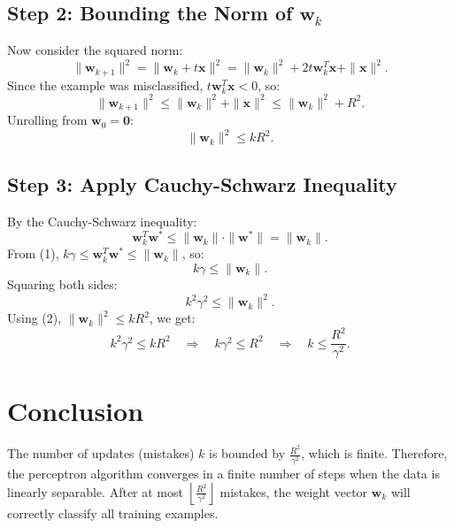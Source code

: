 \documentclass{article}
\begin{document}
\subsection*{Step 2: Bounding the Norm of $\mathbf{w}_k$}

Now consider the squared norm:
\[
\|\mathbf{w}_{k+1}\|^2 = \|\mathbf{w}_k + t \mathbf{x}\|^2 = \|\mathbf{w}_k\|^2 + 2t \mathbf{w}_k^T \mathbf{x} + \|\mathbf{x}\|^2.
\]
Since the example was misclassified, $t \mathbf{w}_k^T \mathbf{x} < 0$, so:
\[
\|\mathbf{w}_{k+1}\|^2 \leq \|\mathbf{w}_k\|^2 + \|\mathbf{x}\|^2 \leq \|\mathbf{w}_k\|^2 + R^2.
\]
Unrolling from $\mathbf{w}_0 = \mathbf{0}$:
\[
\|\mathbf{w}_k\|^2 \leq k R^2.
\tag{2}
\]

\subsection*{Step 3: Apply Cauchy-Schwarz Inequality}

By the Cauchy-Schwarz inequality:
\[
\mathbf{w}_k^T \mathbf{w}^* \leq \|\mathbf{w}_k\| \cdot \|\mathbf{w}^*\| = \|\mathbf{w}_k\|.
\]
From (1), $k \gamma \leq \mathbf{w}_k^T \mathbf{w}^* \leq \|\mathbf{w}_k\|$, so:
\[
k \gamma \leq \|\mathbf{w}_k\|.
\]
Squaring both sides:
\[
k^2 \gamma^2 \leq \|\mathbf{w}_k\|^2.
\]
Using (2), $\|\mathbf{w}_k\|^2 \leq k R^2$, we get:
\[
k^2 \gamma^2 \leq k R^2 \quad \Rightarrow \quad k \gamma^2 \leq R^2 \quad \Rightarrow \quad k \leq \frac{R^2}{\gamma^2}.
\]

\section*{Conclusion}

The number of updates (mistakes) $k$ is bounded by $\frac{R^2}{\gamma^2}$, which is finite. Therefore, the perceptron algorithm converges in a finite number of steps when the data is linearly separable. After at most $\left\lfloor \frac{R^2}{\gamma^2} \right\rfloor$ mistakes, the weight vector $\mathbf{w}_k$ will correctly classify all training examples.
\end{document}

